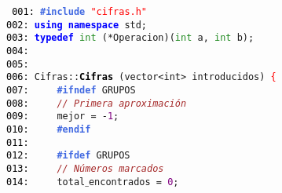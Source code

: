 \documentclass[a4paper,10pt]{scrartcl}
\begin{document}
   
   \small
   \texttt{%
   \noindent
   \mbox{}\texttt{\textcolor{Black}{001:}} \textbf{\textcolor{RoyalBlue}{\#include}}\ \texttt{\textcolor{Red}{"{}cifras.h"{}}} \\
   \mbox{}\texttt{\textcolor{Black}{002:}} \textbf{\textcolor{Blue}{using}}\ \textbf{\textcolor{Blue}{namespace}}\ std\textcolor{BrickRed}{;} \\
   \mbox{}\texttt{\textcolor{Black}{003:}} \textbf{\textcolor{Blue}{typedef}}\ \textcolor{ForestGreen}{int}\ \textcolor{BrickRed}{(*}Operacion\textcolor{BrickRed}{)(}\textcolor{ForestGreen}{int}\ a\textcolor{BrickRed}{,}\ \textcolor{ForestGreen}{int}\ b\textcolor{BrickRed}{);}\  \\
   \mbox{}\texttt{\textcolor{Black}{004:}}  \\
   \mbox{}\texttt{\textcolor{Black}{005:}}  \\
   \mbox{}\texttt{\textcolor{Black}{006:}} Cifras\textcolor{BrickRed}{::}\textbf{\textcolor{Black}{Cifras}}\ \textcolor{BrickRed}{(}\textcolor{TealBlue}{vector\textless{}int\textgreater{}}\ introducidos\textcolor{BrickRed}{)}\ \textcolor{Red}{\{} \\
   \mbox{}\texttt{\textcolor{Black}{007:}} \textbf{\textcolor{RoyalBlue}{\ \ \ \ \#ifndef}}\ GRUPOS \\
   \mbox{}\texttt{\textcolor{Black}{008:}} \ \ \ \ \textit{\textcolor{Brown}{//\ Primera\ aproximación}} \\
   \mbox{}\texttt{\textcolor{Black}{009:}} \ \ \ \ mejor\ \textcolor{BrickRed}{=}\ \textcolor{BrickRed}{-}\textcolor{Purple}{1}\textcolor{BrickRed}{;} \\
   \mbox{}\texttt{\textcolor{Black}{010:}} \textbf{\textcolor{RoyalBlue}{\ \ \ \ \#endif}} \\
   \mbox{}\texttt{\textcolor{Black}{011:}} \ \  \\
   \mbox{}\texttt{\textcolor{Black}{012:}} \textbf{\textcolor{RoyalBlue}{\ \ \ \ \#ifdef}}\ GRUPOS \\
   \mbox{}\texttt{\textcolor{Black}{013:}} \ \ \ \ \textit{\textcolor{Brown}{//\ Números\ marcados}} \\
   \mbox{}\texttt{\textcolor{Black}{014:}} \ \ \ \ total$\_$encontrados\ \textcolor{BrickRed}{=}\ \textcolor{Purple}{0}\textcolor{BrickRed}{;} \\
}
\end{document}
